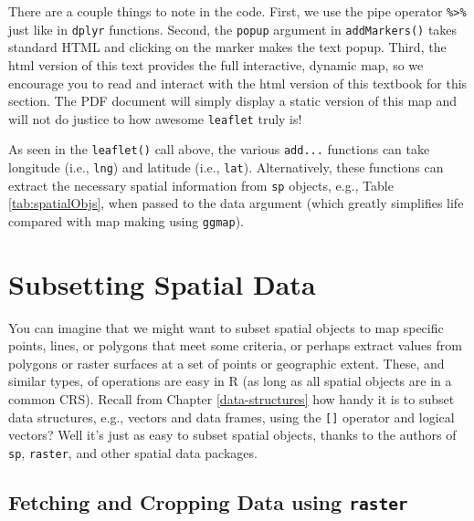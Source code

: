 \documentclass[]{krantz}
\begin{document}
\hypertarget{htmlwidget-e3b83639237a6ff724f4}{}

There are a couple things to note in the code. First, we use the pipe operator \texttt{\%\textgreater{}\%} just like in \texttt{dplyr} functions. Second, the \texttt{popup} argument in \texttt{addMarkers()} takes standard HTML and clicking on the marker makes the text popup. Third, the html version of this text provides the full interactive, dynamic map, so we encourage you to read and interact with the html version of this textbook for this section. The PDF document will simply display a static version of this map and will not do justice to how awesome \texttt{leaflet} truly is!

As seen in the \texttt{leaflet()} call above, the various \texttt{add...} functions can take longitude (i.e., \texttt{lng}) and latitude (i.e., \texttt{lat}). Alternatively, these functions can extract the necessary spatial information from \texttt{sp} objects, e.g., Table \ref{tab:spatialObjs}, when passed to the data argument (which greatly simplifies life compared with map making using \texttt{ggmap}).

\hypertarget{subsetting-spatial-data}{%
\section{Subsetting Spatial Data}\label{subsetting-spatial-data}}

You can imagine that we might want to subset spatial objects to map specific points, lines, or polygons that meet some criteria, or perhaps extract values from polygons or raster surfaces at a set of points or geographic extent. These, and similar types, of operations are easy in R (as long as all spatial objects are in a common CRS). Recall from Chapter \ref{data-structures} how handy it is to subset data structures, e.g., vectors and data frames, using the \texttt{{[}{]}} operator and logical vectors? Well it's just as easy to subset spatial objects, thanks to the authors of \texttt{sp}, \texttt{raster}, and other spatial data packages.

\hypertarget{fetching-and-cropping-data-using-raster}{%
\subsection{\texorpdfstring{Fetching and Cropping Data using \texttt{raster}}{Fetching and Cropping Data using raster}}\label{fetching-and-cropping-data-using-raster}}
\end{document}
